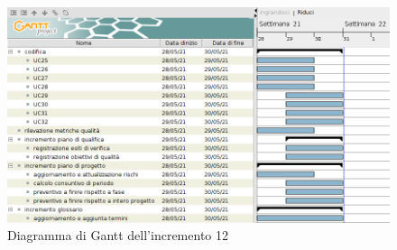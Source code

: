 \begin{figure}[!ht]
    \caption{Diagramma di Gantt dell'incremento 12}
    \vspace{5px}
    \includegraphics[scale=0.3]{../../../Images/Diagrammi/Gantt/incremento12.png}
    \centering
\end{figure}


